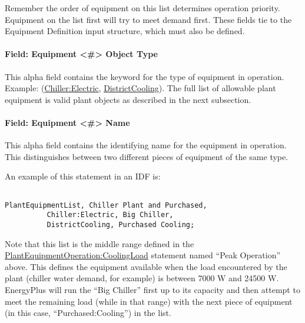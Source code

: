 Remember the order of equipment on this list determines operation priority. Equipment on the list first will try to meet demand first. These fields tie to the Equipment Definition input structure, which must also be defined.

\paragraph{Field: Equipment \textless{}\#\textgreater{} Object Type}\label{field-equipment-object-type-1}

This alpha field contains the keyword for the type of equipment in operation. Example: (\hyperref[chillerelectric]{Chiller:Electric}, \hyperref[districtcooling]{DistrictCooling}). The full list of allowable plant equipment is valid plant objects as described in the next subsection.

\paragraph{Field: Equipment \textless{}\#\textgreater{} Name}\label{field-equipment-name-1}

This alpha field contains the identifying name for the equipment in operation. This distinguishes between two different pieces of equipment of the same type.

An example of this statement in an IDF is:

\begin{lstlisting}

PlantEquipmentList, Chiller Plant and Purchased,
          Chiller:Electric, Big Chiller,
          DistrictCooling, Purchased Cooling;
\end{lstlisting}

Note that this list is the middle range defined in the \hyperref[plantequipmentoperationcoolingload]{PlantEquipmentOperation:CoolingLoad} statement named ``Peak Operation'' above. This defines the equipment available when the load encountered by the plant (chiller water demand, for example) is between 7000 W and 24500 W. EnergyPlus will run the ``Big Chiller'' first up to its capacity and then attempt to meet the remaining load (while in that range) with the next piece of equipment (in this case, ``Purchased:Cooling'') in the list.